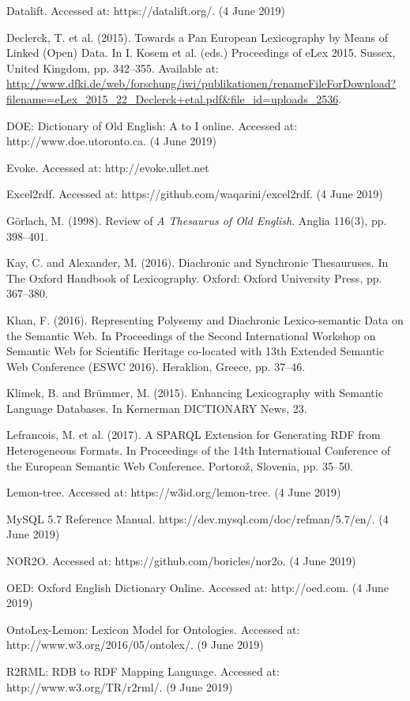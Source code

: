 Datalift. Accessed at: https://datalift.org/. (4 June 2019)

Declerck, T. et al. (2015). Towards a Pan European Lexicography by Means of Linked (Open) Data. In I. Kosem et al. (eds.) Proceedings of eLex 2015. Sussex, United Kingdom, pp. 342–355. Available at: \url{http://www.dfki.de/web/forschung/iwi/publikationen/renameFileForDownload?filename=eLex_2015_22_Declerck+etal.pdf&file_id=uploads_2536}.

DOE: Dictionary of Old English: A to I online. Accessed at: http://www.doe.utoronto.ca. (4 June 2019)

Evoke. Accessed at: http://evoke.ullet.net

Excel2rdf. Accessed at: https://github.com/waqarini/excel2rdf. (4 June 2019)

Görlach, M. (1998). Review of \textit{A Thesaurus of Old English}. Anglia 116(3), pp. 398–401.

Kay, C. and Alexander, M. (2016). Diachronic and Synchronic Thesauruses. In The Oxford Handbook of Lexicography. Oxford: Oxford University Press, pp. 367–380.

Khan, F. (2016). Representing Polysemy and Diachronic Lexico-semantic Data on the Semantic Web. In Proceedings of the Second International Workshop on Semantic Web for Scientific Heritage co-located with 13th Extended Semantic Web Conference (ESWC 2016). Heraklion, Greece, pp. 37–46.

Klimek, B. and Brümmer, M. (2015). Enhancing Lexicography with Semantic Language Databases. In Kernerman DICTIONARY News, 23.

Lefrancois, M. et al. (2017). A SPARQL Extension for Generating RDF from Heterogeneous Formats. In Proceedings of the 14th International Conference of the European Semantic Web Conference. Portorož, Slovenia, pp. 35–50.

Lemon-tree. Accessed at: https://w3id.org/lemon-tree. (4 June 2019)

MySQL 5.7 Reference Manual. https://dev.mysql.com/doc/refman/5.7/en/. (4 June 2019)

NOR2O. Accessed at: https://github.com/boricles/nor2o. (4 June 2019)

OED: Oxford English Dictionary Online. Accessed at: http://oed.com. (4 June 2019)

OntoLex-Lemon: Lexicon Model for Ontologies. Accessed at: http://www.w3.org/2016/05/ontolex/. (9 June 2019)

R2RML: RDB to RDF Mapping Language. Accessed at: http://www.w3.org/TR/r2rml/. (9 June 2019)

